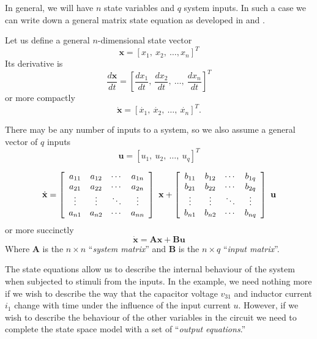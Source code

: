\fi
In general, we will have $n$ state variables and $q$ system
inputs. In such a case we can write down a general matrix state
equation as developed in  and .
\begin{slide}\label{slide:l1s3}
 Let us define a general
$n$-dimensional state vector
\[\mathbf{x} = \left[x_1,\ x_2,\ \ldots, x_n\right]^T\] Its
derivative is
\[\frac{d\mathbf{x}}{dt} = \left[\frac{dx_1}{dt},\ \frac{dx_2}{dt},\
\ldots,\
\frac{dx_n}{dt}\right]^T\] or more compactly
\[\dot{\mathbf{x}}=\left[\dot{x_1},\ \dot{x_2},\ \ldots,\
\dot{x_n}\right]^T.\]

There may be any number of inputs to a system, so we also assume a
general vector of $q$ inputs
\[\mathbf{u}=\left[u_1,\ u_2,\ \ldots,\ u_q\right]^T\]
\end{slide}

\begin{slide}\label{slide:l1s4}
\[
\dot{\mathbf{x}}=\left[\begin{array}{cccc}
  a_{11} & a_{12} & \cdots & a_{1n} \\
  a_{21} & a_{22} & \cdots & a_{2n} \\
  \vdots & \vdots & \ddots & \vdots \\
  a_{n1} & a_{n2} & \cdots & a_{nn}
\end{array}\right]\ \mathbf{x} + \left[\begin{array}{cccc}
  b_{11} & b_{12} & \cdots & b_{1q} \\
  b_{21} & b_{22} & \cdots & b_{2q} \\
  \vdots & \vdots & \ddots & \vdots \\
  b_{n1} & b_{n2} & \cdots & b_{nq}
\end{array}\right]\ \mathbf{u} \\
\]
or more succinctly
\[
\dot{\mathbf{x}}=\mathbf{A}\mathbf{x}+\mathbf{B}\mathbf{u}
\]
Where $\mathbf{A}$ is the $n\times n$ ``\emph{system matrix}'' and
$\mathbf{B}$ is the $n\times q$ ``\emph{input matrix}''.
\end{slide}


The state equations allow us to describe the internal behaviour of
the system when subjected to stimuli from the inputs. In the
example, we need nothing more if we wish to describe the way that
the capacitor voltage $v_{31}$ and inductor current $i_1$ change
with time under the influence of the input current $u$. However,
if we wish to describe the behaviour of the other variables in the
circuit we need to complete the state space model with a set of
``\emph{output equations}.''


